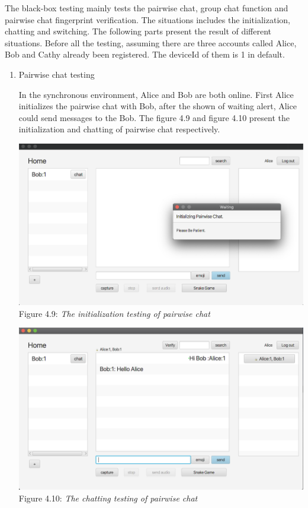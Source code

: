 The black-box testing mainly tests the pairwise chat, group chat function and pairwise chat fingerprint verification. The situations includes the initialization, chatting and switching. The following parts present the result of different situations. Before all the testing, assuming there are three accounts called Alice, Bob and Cathy already been registered. The deviceId of them is 1 in default.

\begin{enumerate}[label=(\roman*)]
\item Pairwise chat testing

In the synchronous environment, Alice and Bob are both online. First Alice initializes the pairwise chat with Bob, after the shown of waiting alert, Alice could send messages to the Bob. The figure 4.9 and figure 4.10 present the initialization and chatting of pairwise chat respectively.

\begin{center}
\includegraphics[scale=.45]{../4-Implementation/resources/pairwise-init.png}\\
Figure 4.9: \textit{The initialization testing of pairwise chat}
\end{center}

\begin{center}
\includegraphics[scale=.45]{../4-Implementation/resources/pairwise-chat.png}\\
Figure 4.10: \textit{The chatting testing of pairwise chat}
\end{center}


\end{enumerate}
